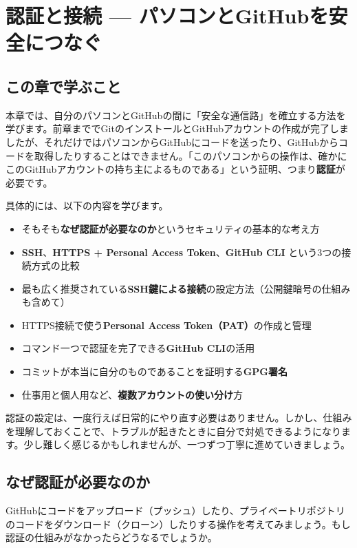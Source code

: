 \chapter{認証と接続 — パソコンとGitHubを安全につなぐ}

\section{この章で学ぶこと}

本章では、自分のパソコンとGitHubの間に「安全な通信路」を確立する方法を学びます。前章まででGitのインストールとGitHubアカウントの作成が完了しましたが、それだけではパソコンからGitHubにコードを送ったり、GitHubからコードを取得したりすることはできません。「このパソコンからの操作は、確かにこのGitHubアカウントの持ち主によるものである」という証明、つまり\textbf{認証}が必要です。

具体的には、以下の内容を学びます。

\begin{itemize}
  \item そもそも\textbf{なぜ認証が必要なのか}というセキュリティの基本的な考え方
  \item \textbf{SSH}、\textbf{HTTPS + Personal Access Token}、\textbf{GitHub CLI} という3つの接続方式の比較
  \item 最も広く推奨されている\textbf{SSH鍵による接続}の設定方法（公開鍵暗号の仕組みも含めて）
  \item HTTPS接続で使う\textbf{Personal Access Token（PAT）}の作成と管理
  \item コマンド一つで認証を完了できる\textbf{GitHub CLI}の活用
  \item コミットが本当に自分のものであることを証明する\textbf{GPG署名}
  \item 仕事用と個人用など、\textbf{複数アカウントの使い分け}方
\end{itemize}

認証の設定は、一度行えば日常的にやり直す必要はありません。しかし、仕組みを理解しておくことで、トラブルが起きたときに自分で対処できるようになります。少し難しく感じるかもしれませんが、一つずつ丁寧に進めていきましょう。

\section{なぜ認証が必要なのか}

GitHubにコードをアップロード（プッシュ）したり、プライベートリポジトリのコードをダウンロード（クローン）したりする操作を考えてみましょう。もし認証の仕組みがなかったらどうなるでしょうか。

